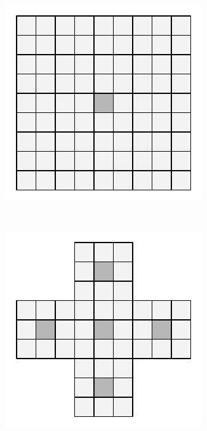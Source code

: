 \begin{figure}
\label{fig:adaptivewindow}
  \setcounter{subfigure}{0}
  \centering
  \begin{subfigure}[b]{0.20\textwidth}
    \includegraphics[width=\textwidth]{images/adaptive-windows-9x9.pdf}
    \caption{}
  \end{subfigure}
  ~
  \begin{subfigure}[b]{0.20\textwidth}
    \includegraphics[width=\textwidth]{images/adaptive-windows.pdf}

\end{subfigure}
\end{figure}
